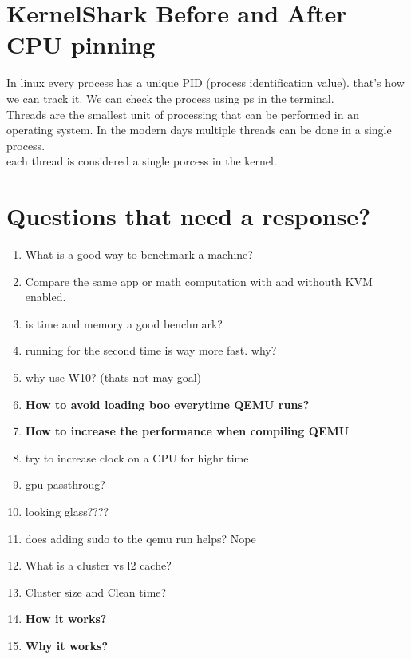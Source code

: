 \documentclass[11pt, a4paper, oneside]{article}
\theoremstyle{definition}
\begin{document}
\vfill
\pagebreak
\section{KernelShark Before and After CPU pinning}

In linux every process has a unique PID (process identification value). that's how we can track it.
We can check the process using ps in the terminal.\\
Threads are the smallest unit of processing that can be performed in an operating system. In the modern days multiple threads can be done in a single process.\\
each thread is considered a single porcess in the kernel.\\



\vfill
\pagebreak
\section{Questions that need a response?}
\begin{enumerate}
	\item What is a good way to benchmark a machine?
	\item Compare the same app or math computation with and withouth KVM enabled.
	\item is time and memory a good benchmark?
	\item running for the second time is way more fast. why?
	\item why use W10? (thats not may goal)
	\item \textbf{How to avoid loading boo everytime QEMU runs?}
	\item \textbf{How to increase the performance when compiling QEMU}
	\item try to increase clock on a CPU for highr time
	\item gpu passthroug?
	\item looking glass????
	\item does adding sudo to the qemu run helps? Nope
	\item What is a cluster vs l2 cache?
	\item Cluster size and Clean time?
	\item \textbf{How it works?}
	\item \textbf{Why it works?}
\end{enumerate}
\end{document}
